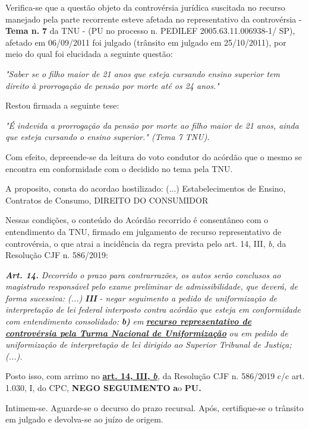 \documentclass[12pt]{article}
\begin{document}
\justifying
\noindent Verifica-se que a questão objeto da controvérsia jurídica suscitada no recurso manejado pela parte recorrente esteve afetada no representativo da controvérsia - \textbf{Tema n. }\textbf{7} da TNU - (PU no processo n. PEDILEF 2005.63.11.006938-1/ SP),  afetado em 06/09/2011 foi julgado (trânsito em julgado em 25/10/2011), por meio do qual foi elucidada a seguinte questão:

\noindent \textit{"Saber se o filho maior de 21 anos que esteja cursando ensino superior tem direito à prorrogação de pensão por morte até os 24 anos."}

\noindent Restou firmada a seguinte tese:

\noindent \textit{"É indevida a prorrogação da pensão por morte ao filho maior de 21 anos, ainda que esteja cursando o ensino superior." (Tema 7 TNU).}

\noindent Com efeito, depreende-se da leitura do voto condutor do acórdão que o mesmo se encontra em conformidade com o decidido no  tema pela TNU.

\noindent A proposito, consta do acordao hostilizado: (...) Estabelecimentos de Ensino, Contratos de Consumo, DIREITO DO CONSUMIDOR

\noindent Nessas condições, o conteúdo do Acórdão recorrido é consentâneo com o entendimento da TNU, firmado em julgamento de recurso representativo de controvérsia, o que atrai a incidência da regra prevista pelo art. 14, III, \textit{b,} da Resolução CJF n. 586/2019:

\noindent \textit{\textbf{Art. 14.}}\textit{ Decorrido o prazo para contrarrazões, os autos serão conclusos ao magistrado responsável pelo exame preliminar de admissibilidade, que deverá, de forma sucessiva: (...) }\textit{\textbf{III }}\textit{- negar seguimento a pedido de uniformização de interpretação de lei federal interposto contra acórdão que esteja em conformidade com entendimento consolidado: }\textit{\textbf{b)}}\textit{ em }\uline{\textit{\textbf{recurso representativo de controvérsia pela Turma Nacional de Uniformização}}}\textit{ ou em pedido de uniformização de interpretação de lei dirigido ao Superior Tribunal de Justiça;(...).}

\noindent Posto isso, com arrimo no \uline{\textbf{art. 14, III, }}\uline{\textit{\textbf{b}}}\textit{,} da Resolução CJF n. 586/2019 c/c art. 1.030, I, do CPC, \textbf{NEGO SEGUIMENTO }\textbf{a}o\textbf{ PU}\textbf{.}

\noindent Intimem-se. Aguarde-se o decurso do prazo recursal. Após, certifique-se o trânsito em julgado e devolva-se ao juízo de origem.
\end{document}
